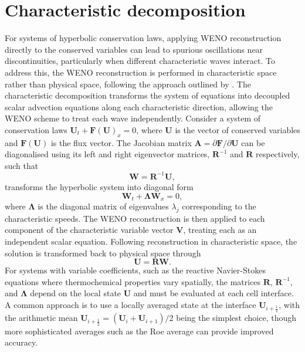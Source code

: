 \section{Characteristic decomposition}

For systems of hyperbolic conservation laws, applying WENO reconstruction directly to the conserved variables can lead to spurious oscillations near discontinuities, particularly when different characteristic waves interact. To address this, the WENO reconstruction is performed in characteristic space rather than physical space, following the approach outlined by \citet{JiangShu1996}. The characteristic decomposition transforms the system of equations into decoupled scalar advection equations along each characteristic direction, allowing the WENO scheme to treat each wave independently. Consider a system of conservation laws $\mathbf{U}_t + \mathbf{F}(\mathbf{U})_x = 0$, where $\mathbf{U}$ is the vector of conserved variables and $\mathbf{F}(\mathbf{U})$ is the flux vector. The Jacobian matrix $\mathbf{A} = \partial \mathbf{F}/\partial \mathbf{U}$ can be diagonalised using its left and right eigenvector matrices, $\mathbf{R}^{-1}$ and $\mathbf{R}$ respectively, such that
\begin{equation}
\mathbf{W} = \mathbf{R}^{-1}\mathbf{U},
\end{equation}
transforms the hyperbolic system into diagonal form
\begin{equation}
\mathbf{W}_t + \mathbf{\Lambda}\mathbf{W}_x = 0,
\end{equation}
where $\mathbf{\Lambda}$ is the diagonal matrix of eigenvalues $\lambda_j$ corresponding to the characteristic speeds. The WENO reconstruction is then applied to each component of the characteristic variable vector $\mathbf{V}$, treating each as an independent scalar equation. Following reconstruction in characteristic space, the solution is transformed back to physical space through
\begin{equation}
\mathbf{U} = \mathbf{R}\mathbf{W}.
\end{equation}
For systems with variable coefficients, such as the reactive Navier-Stokes equations where thermochemical properties vary spatially, the matrices $\mathbf{R}$, $\mathbf{R}^{-1}$, and $\mathbf{\Lambda}$ depend on the local state $\mathbf{U}$ and must be evaluated at each cell interface. A common approach is to use a locally averaged state at the interface $\mathbf{U}_{i+\frac{1}{2}}$, with the arithmetic mean $\mathbf{U}_{i+\frac{1}{2}} = (\mathbf{U}_i + \mathbf{U}_{i+1})/2$ being the simplest choice, though more sophisticated averages such as the Roe average can provide improved accuracy. 


